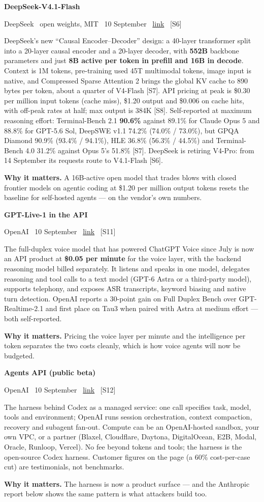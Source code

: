 \documentclass[11pt,a4paper]{article}
\newcommand{\entry}[4]{%
  \par\vspace{0.7em}%
  \Needspace*{5\baselineskip}%
  {\sffamily\bfseries\color{brandink}#1}\par
  {\footnotesize\color{brandgrey}#2 \textbullet\ \href{#3}{link} \textbullet\ \srcref{#4}}\par
  \vspace{0.15em}}
\newcommand{\why}[1]{\par{\small\textbf{Why it matters.} #1}\par}
\newcommand{\srcref}[1]{\textcolor{brandaccent}{[S#1]}}
\begin{document}
\entry{DeepSeek-V4.1-Flash}{DeepSeek \textbullet\ open weights, MIT \textbullet\ 10 September}{https://huggingface.co/deepseek-ai/DeepSeek-V4.1-Flash}{6}
DeepSeek's new ``Causal Encoder--Decoder'' design: a 40-layer transformer
split into a 20-layer causal encoder and a 20-layer decoder, with \textbf{552B} backbone
parameters and just \textbf{8B active per token in prefill and 16B in decode}. Context is
1M tokens, pre-training used 45T multimodal tokens, image input is native, and Compressed
Sparse Attention 2 brings the global KV cache to 890 bytes per token, about a quarter of
V4-Flash \srcref{7}. API pricing at peak is \$0.30 per million input tokens (cache miss),
\$1.20 output and \$0.006 on cache hits, with off-peak rates at half; max output is 384K
\srcref{8}. Self-reported at maximum reasoning effort: Terminal-Bench 2.1 \textbf{90.6\%}
against 89.1\% for Claude Opus 5 and 88.8\% for GPT-5.6 Sol, DeepSWE v1.1 74.2\%
(74.0\% / 73.0\%), but GPQA Diamond 90.9\% (93.4\% / 94.1\%), HLE 36.8\% (56.3\% / 44.5\%)
and Terminal-Bench 4.0 31.2\% against Opus 5's 51.8\% \srcref{7}. DeepSeek is retiring
V4-Pro: from 14 September its requests route to V4.1-Flash \srcref{6}.
\why{A 16B-active open model that trades blows with closed frontier models on agentic
coding at \$1.20 per million output tokens resets the baseline for self-hosted agents ---
on the vendor's own numbers.}

\entry{GPT-Live-1 in the API}{OpenAI \textbullet\ 10 September}{https://openai.com/index/introducing-gpt-live-1-in-the-api/}{11}
The full-duplex voice model that has powered ChatGPT Voice since July is now an API product
at \textbf{\$0.05 per minute} for the voice layer, with the backend reasoning model billed
separately. It listens and speaks in one model, delegates reasoning and tool calls to a
text model (GPT-6 Astra or a third-party model), supports telephony, and exposes ASR
transcripts, keyword biasing and native turn detection. OpenAI reports a 30-point gain on
Full Duplex Bench over GPT-Realtime-2.1 and first place on Tau3 when paired with Astra at
medium effort --- both self-reported.
\why{Pricing the voice layer per minute and the intelligence per token separates the two
costs cleanly, which is how voice agents will now be budgeted.}

\entry{Agents API (public beta)}{OpenAI \textbullet\ 10 September}{https://openai.com/index/introducing-the-agents-api/}{12}
The harness behind Codex as a managed service: one call specifies task, model, tools and
environment; OpenAI runs session orchestration, context compaction, recovery and subagent
fan-out. Compute can be an OpenAI-hosted sandbox, your own VPC, or a partner (Blaxel,
Cloudflare, Daytona, DigitalOcean, E2B, Modal, Oracle, Runloop, Vercel). No fee beyond
tokens and tools; the harness is the open-source Codex harness. Customer figures on the
page (a 60\% cost-per-case cut) are testimonials, not benchmarks.
\why{The harness is now a product surface --- and the Anthropic report below shows the
same pattern is what attackers build too.}
\end{document}
